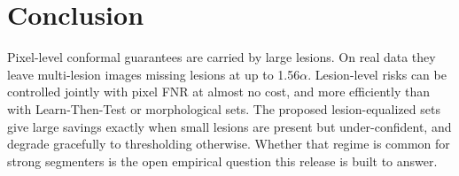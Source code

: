 \section{Conclusion}
Pixel-level conformal guarantees are carried by large lesions. On real data they
leave multi-lesion images missing lesions at up to 1.56$\alpha$. Lesion-level
risks can be controlled jointly with pixel FNR at almost no cost, and more
efficiently than with Learn-Then-Test or morphological sets. The proposed
lesion-equalized sets give large savings exactly when small lesions are present
but under-confident, and degrade gracefully to thresholding otherwise. Whether
that regime is common for strong segmenters is the open empirical question this
release is built to answer.
